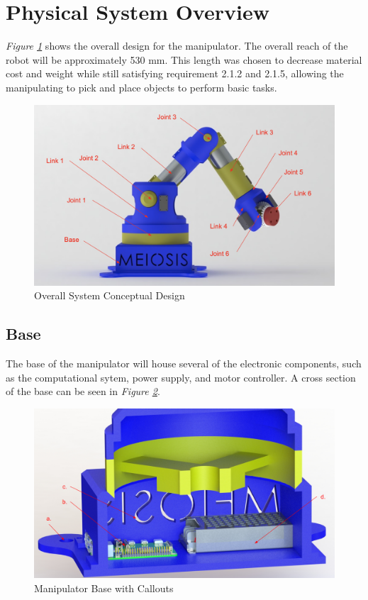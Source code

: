 \documentclass[12pt]{report}
\begin{document}
\section{Physical System Overview}
\emph{Figure \ref{fig:overall}} shows the overall design for the manipulator. The overall reach of the robot will be approximately 530 mm. This length was chosen to decrease material cost and weight while still satisfying requirement 2.1.2 and 2.1.5, allowing the manipulating to pick and place objects to perform basic tasks.

\begin{figure}[h]
  \centering
  \includegraphics[frame, width=.75\textwidth]{overall_render}
  \caption{Overall System Conceptual Design }
  \label{fig:overall}
\end{figure}
\newpage
\subsection{Base}
The base of the manipulator will house several of the electronic components, such as the computational sytem, power supply, and motor controller. A cross section of the base can be seen in \emph{Figure \ref{fig:base}}.
\begin{figure}[h]
  \centering
  \includegraphics[frame, width=.75\textwidth]{base_callouts}
  \caption{Manipulator Base with Callouts}
  \label{fig:base}
\end{figure}
\end{document}

